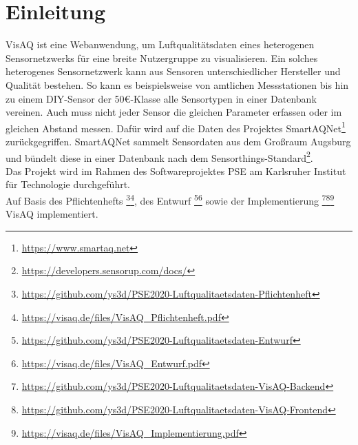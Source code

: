 \section{Einleitung}
VisAQ ist eine Webanwendung, um Luftqualitätsdaten eines heterogenen \gls{Sensor}netzwerks für eine breite Nutzergruppe zu visualisieren.
Ein solches heterogenes Sensornetzwerk kann aus Sensoren unterschiedlicher Hersteller und Qualität bestehen.
So kann es beispielsweise von amtlichen Messstationen bis hin zu einem DIY-Sensor der 50\euro-Klasse alle Sensortypen in einer Datenbank vereinen.
Auch muss nicht jeder Sensor die gleichen Parameter erfassen oder im gleichen Abstand messen.
Dafür wird auf die Daten des Projektes SmartAQNet\footnote{\url{https://www.smartaq.net}} zurückgegriffen.
SmartAQNet sammelt Sensordaten aus dem Großraum Augsburg und bündelt diese in einer Datenbank nach dem Sensorthings-Standard\footnote{\url{https://developers.sensorup.com/docs/}}.
\\
Das Projekt wird im Rahmen des Softwareprojektes PSE am Karlsruher Institut für Technologie durchgeführt.
\\
Auf Basis des Pflichtenhefts
\footnote{\url{https://github.com/ys3d/PSE2020-Luftqualitaetsdaten-Pflichtenheft}}\footnote{\url{https://visaq.de/files/VisAQ_Pflichtenheft.pdf}},
des Entwurf
\footnote{\url{https://github.com/ys3d/PSE2020-Luftqualitaetsdaten-Entwurf}}\footnote{\url{https://visaq.de/files/VisAQ_Entwurf.pdf}}
sowie der Implementierung
\footnote{\url{https://github.com/ys3d/PSE2020-Luftqualitaetsdaten-VisAQ-Backend}}\footnote{\url{https://github.com/ys3d/PSE2020-Luftqualitaetsdaten-VisAQ-Frontend}}\footnote{\url{https://visaq.de/files/VisAQ_Implementierung.pdf}}
VisAQ implementiert.
